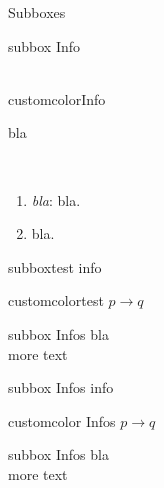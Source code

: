 \documentclass[10pt,a4paper]{article}
\begin{document}
\begin{multicols}{3}
\begin{textbox}{Subboxes}
\begin{multibox}{2}
\begin{subbox}{subbox}{ Info}
				\\
				\\
				
			\end{subbox}
			\begin{subbox}{customcolor}{Info}
				
			\end{subbox}
		\end{multibox}
	\end{textbox}
	
	
	
	\begin{textbox}{bla}
		
		\\
		\begin{enumerate}
			\item \emph{bla}: bla.
			\item bla.
		\end{enumerate}
		
		\begin{multibox}{3} %
			\begin{subbox}{subbox}{test}
				info
			\end{subbox}
			\begin{subbox}{customcolor}{test}
				$p \to q$
			\end{subbox}
			\begin{subbox}{subbox}{ Infos}
				bla \\
				more text
			\end{subbox}
		\end{multibox}
		
		\begin{multibox}{3} %
			\begin{subbox}{subbox}{ Infos}
				info
			\end{subbox}
			\begin{subbox}{customcolor}{ Infos}
				$p \to q$
			\end{subbox}
			\begin{subbox}{subbox}{ Infos}
				bla \\
				more text
			\end{subbox}
		\end{multibox}
		
	\end{textbox}
	
	\AtNextBibliography{\footnotesize}
	\printbibliography  
\end{multicols}
\end{document}

